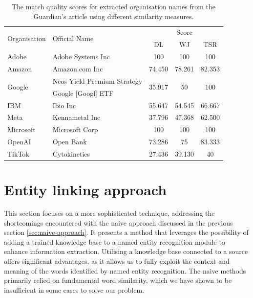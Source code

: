 \begin{table}[ht]
    \centering
    \caption{The match quality scores for extracted organisation names from the Guardian's article using different similarity measures.}
    \label{table:combined-scores}
    \begin{tabular}{l l c c c}
        \hline
        \multirow{2}{*}{Organisation} & \multirow{2}{*}{Official Name} & \multicolumn{3}{c}{Score}\\
        \cline{3-5}
        & & DL & WJ & TSR \\
        \hline
        Adobe & Adobe Systems Inc & 100 & 100 & 100 \\
        Amazon & Amazon.com Inc & 74.450 & 78.261 & 82.353 \\
        \multirow{2}{*}{Google} & Neos Yield Premium Strategy& \multirow{2}{*}{35.917} & \multirow{2}{*}{50} & \multirow{2}{*}{100} \\
        & Google [Googl] ETF & & & \\
        IBM & Ibio Inc & 55.647 & 54.545 & 66.667 \\
        Meta & Kennametal Inc & 37.796 & 47.368 & 62.500 \\
        Microsoft & Microsoft Corp & 100 & 100 & 100 \\
        OpenAI & Open Bank & 73.286 & 75 & 83.333 \\
        TikTok & Cytokinetics & 27.436 & 39.130 & 40 \\
        \hline
    \end{tabular}
\end{table}

\section{Entity linking approach}
\label{sec:entity-linking-approach}
This section focuses on a more sophisticated technique, addressing the shortcomings encountered with the naive approach discussed in the previous section \ref{sec:naive-approach}. It presents a method that leverages the possibility of adding a trained knowledge base \parencite{spacy_kb} to a named entity recognition module to enhance information extraction. Utilising a knowledge base connected to a source offers significant advantages, as it allows us to fully exploit the context and meaning of the words identified by named entity recognition. The naive methods primarily relied on fundamental word similarity, which we have shown to be insufficient in some cases to solve our problem.


